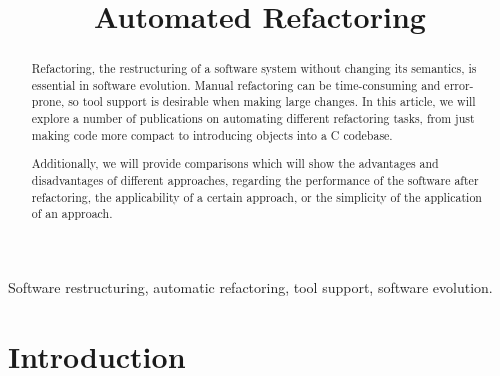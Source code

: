 \documentclass[conference,compsoc,a4paper]{IEEEtran}
\begin{document}
\title{Automated Refactoring}
\author{
  \and
}

\maketitle


\begin{abstract}
Refactoring, the restructuring of a software system without changing its semantics, is essential in software evolution. 
Manual refactoring can be time-consuming and error-prone, so tool support is desirable when making large changes. In 
this article, we will explore a number of publications on automating different refactoring tasks, from just making code 
more compact to introducing objects into a C codebase.

Additionally, we will provide comparisons which will show the advantages and disadvantages of different approaches, 
regarding the performance of the software after refactoring, the applicability of a certain approach, or the simplicity 
of the application of an approach.


\end{abstract}

\begin{IEEEkeywords}
Software restructuring, automatic refactoring, tool support, software evolution.
\end{IEEEkeywords}

%
\IEEEpeerreviewmaketitle


\section{Introduction}
\end{document}

